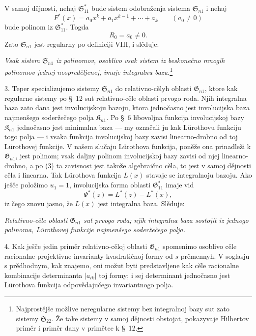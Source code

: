 \documentclass[11pt]{article}
\providecommand{\Kfield}{\mathfrak{K}}
\providecommand{\Ssys}{\mathfrak{S}}
\providecommand{\Gdom}{\mathfrak{G}}
\begin{document}
V samoj dějnosti, nehaj $\Ssys^*_{11}$ bude sistem odobraženja sistema $\Ssys_{n1}$ i nehaj
\[
  F^*(x)=a_0x^k+a_1x^{k-1}+\cdots+a_k\qquad(a_0\ne0)
\]
bude polinom iz $\Ssys^*_{11}$. Togda
\begin{equation}
  R_0=a_0\ne0.
\tag{3}
\end{equation}
Zato $\Ssys_{n1}$ jest regularny po definiciji VIII, i slěduje:

{\itshape Vsak sistem $\Ssys_{n1}$ iz polinomov, osoblivo vsak sistem iz beskonečno mnogih polinomov jednej neopreděljenej, imaje integralnu bazu.}\footnote{Najprostějše možlive neregularne sistemy bez integralnoj bazy sut zato sistemy $\Ssys_{22}$. Že take sistemy v samoj dějnosti obstojat, pokazyvaje Hilbertov priměr i priměr dany v primětce k \S\ 12.}

3. Teper specializujemo sistemy $\Ssys_{n1}$ do relativno-cělyh oblasti $\Gdom_{n1}$, ktore kak regularne sistemy po \S\ 12 sut relativno-cěle oblasti prvogo roda. Njih integralna baza zato dana jest involucijskoju bazoju, ktora jednočasno jest involucijska baza najmenšego soderžečego polja $\Kfield_{n1}$. Po \S\ 6 libovoljna funkcija involucijskoj bazy $\Kfield_{n1}$ jednočasno jest minimalna baza --- my označali ju kak Lürothovu funkciju togo polja --- i vsaka funkcija involucijskoj bazy zavisi linearno-drobno od toj Lürothovej funkcije. V našem slučaju Lürothova funkcija, poněže ona prinadleži k $\Gdom_{n1}$, jest polinom; vsak daljny polinom involucijskoj bazy zavisi od njej linearno-drobno, a po (3) ta zavisnost jest takože algebraično cěla, to jest v samoj dějnosti cěla i linearna. Tak Lürothova funkcija $L(x)$ stavaje se integralnoju bazoju. Ako ješče položimo $u_1=1$, involucijska forma oblasti $\Gdom^*_{11}$ imaje vid
\[
  \Psi^*(z)=L^*(z)-L^*(x),
\]
iz čego znovu jasno, že $L(x)$ jest integralna baza. Slěduje:

{\itshape Relativno-cěle oblasti $\Gdom_{n1}$ sut prvogo roda; njih integralna baza sostojit iz jednogo polinoma, Lürothovej funkcije najmenšego soderžečego polja.}

4. Kak ješče jedin priměr relativno-cěloj oblasti $\Gdom_{n1}$ spomenimo osoblivo cěle racionalne projektivne invarianty kvadratičnoj formy od $s$ prěmennyh. V soglasju s prědhodnym, kak znajemo, oni možut byti predstavljene kak cěle racionalne kombinacije determinanta $|a_{ik}|$ toj formy; i sej determinant jednočasno jest Lürothova funkcija odpovědajučego invariantnogo polja.
\end{document}
